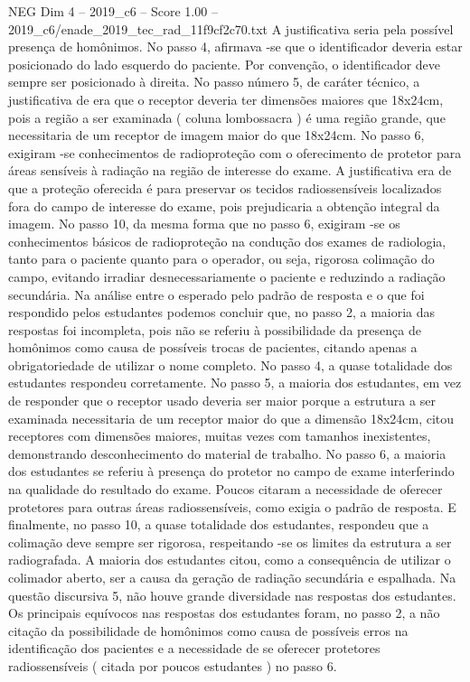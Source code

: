 \begin{textsample}{NEG Dim 4 – 2019\_c6 – Score 1.00 – 2019\_c6/enade\_2019\_tec\_rad\_11f9cf2c70.txt}
A justificativa seria pela possível presença de homônimos.
No passo 4, afirmava -se que o identificador deveria estar posicionado do lado esquerdo do paciente.
Por convenção, o identificador deve sempre ser posicionado à direita.
No passo número 5, de caráter técnico, a justificativa de era que o receptor deveria ter dimensões maiores que 18x24cm, pois a região a ser examinada ( coluna lombossacra ) é uma região grande, que necessitaria de um receptor de imagem maior do que 18x24cm.
No passo 6, exigiram -se conhecimentos de radioproteção com o oferecimento de protetor para áreas sensíveis à radiação na região de interesse do exame.
A justificativa era de que a proteção oferecida é para preservar os tecidos radiossensíveis localizados fora do campo de interesse do exame, pois prejudicaria a obtenção integral da imagem.
No passo 10, da mesma forma que no passo 6, exigiram -se os conhecimentos básicos de radioproteção na condução dos exames de radiologia, tanto para o paciente quanto para o operador, ou seja, rigorosa colimação do campo, evitando irradiar desnecessariamente o paciente e reduzindo a radiação secundária.
Na análise entre o esperado pelo padrão de resposta e o que foi respondido pelos estudantes podemos concluir que, no passo 2, a maioria das respostas foi incompleta, pois não se referiu à possibilidade da presença de homônimos como causa de possíveis trocas de pacientes, citando apenas a obrigatoriedade de utilizar o nome completo.
No passo 4, a quase totalidade dos estudantes respondeu corretamente.
No passo 5, a maioria dos estudantes, em vez de responder que o receptor usado deveria ser maior porque a estrutura a ser examinada necessitaria de um receptor maior do que a dimensão 18x24cm, citou receptores com dimensões maiores, muitas vezes com tamanhos inexistentes, demonstrando desconhecimento do material de trabalho.
No passo 6, a maioria dos estudantes se referiu à presença do protetor no campo de exame interferindo na qualidade do resultado do exame.
Poucos citaram a necessidade de oferecer protetores para outras áreas radiossensíveis, como exigia o padrão de resposta.
E finalmente, no passo 10, a quase totalidade dos estudantes, respondeu que a colimação deve sempre ser rigorosa, respeitando -se os limites da estrutura a ser radiografada.
A maioria dos estudantes citou, como a consequência de utilizar o colimador aberto, ser a causa da geração de radiação secundária e espalhada.
Na questão discursiva 5, não houve grande diversidade nas respostas dos estudantes.
Os principais equívocos nas respostas dos estudantes foram, no passo 2, a não citação da possibilidade de homônimos como causa de possíveis erros na identificação dos pacientes e a necessidade de se oferecer protetores radiossensíveis ( citada por poucos estudantes ) no passo 6.

\end{textsample}
